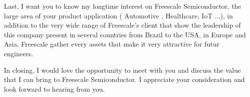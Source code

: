 \documentclass[11pt,a4paper]{moderncv}
\begin{document}
Last, I want you to know my longtime interest on Freescale Semiconductor, the large area of your product application ( Automotive , Healthcare, IoT ...), in addition to the very wide range of Freescale's client that show the leadership of this company present in several countries from Brazil to the USA, in Europe and Asia. Freescale gather every assets that make it very attractive for futur engineers.   

In closing, I would love the opportunity to meet with you and discuss the value that I can bring to Freescale Semiconductor. I appreciate your consideration and look forward to hearing from you.



\makeletterclosing %
\end{document}
